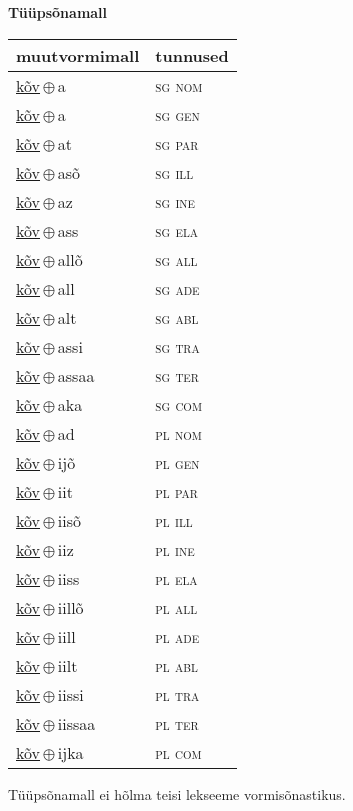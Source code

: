

\vspace{3.5em}
\noindent \begin{minipage}{\textwidth}
\noindent \textbf{Tüüpsõnamall \,}\\

\begin{sideways}
\begin{tabular}{l l}
muutvormimall & tunnused \\
\hline
\underline{kõv}\,$\oplus$\,a & \textsc{ sg nom } \\
\underline{kõv}\,$\oplus$\,a & \textsc{ sg gen } \\
\underline{kõv}\,$\oplus$\,at & \textsc{ sg par } \\
\underline{kõv}\,$\oplus$\,asõ & \textsc{ sg ill } \\
\underline{kõv}\,$\oplus$\,az & \textsc{ sg ine } \\
\underline{kõv}\,$\oplus$\,ass & \textsc{ sg ela } \\
\underline{kõv}\,$\oplus$\,allõ & \textsc{ sg all } \\
\underline{kõv}\,$\oplus$\,all & \textsc{ sg ade } \\
\underline{kõv}\,$\oplus$\,alt & \textsc{ sg abl } \\
\underline{kõv}\,$\oplus$\,assi & \textsc{ sg tra } \\
\underline{kõv}\,$\oplus$\,assaa & \textsc{ sg ter } \\
\underline{kõv}\,$\oplus$\,aka & \textsc{ sg com } \\
\underline{kõv}\,$\oplus$\,ad & \textsc{ pl nom } \\
\underline{kõv}\,$\oplus$\,ijõ & \textsc{ pl gen } \\
\underline{kõv}\,$\oplus$\,iit & \textsc{ pl par } \\
\underline{kõv}\,$\oplus$\,iisõ & \textsc{ pl ill } \\
\underline{kõv}\,$\oplus$\,iiz & \textsc{ pl ine } \\
\underline{kõv}\,$\oplus$\,iiss & \textsc{ pl ela } \\
\underline{kõv}\,$\oplus$\,iillõ & \textsc{ pl all } \\
\underline{kõv}\,$\oplus$\,iill & \textsc{ pl ade } \\
\underline{kõv}\,$\oplus$\,iilt & \textsc{ pl abl } \\
\underline{kõv}\,$\oplus$\,iissi & \textsc{ pl tra } \\
\underline{kõv}\,$\oplus$\,iissaa & \textsc{ pl ter } \\
\underline{kõv}\,$\oplus$\,ijka & \textsc{ pl com } \\
\end{tabular}
\end{sideways}
\label{tab:tüüpsõnamall-kõva}

\end{minipage}

 
\vspace{1em}
\noindent Tüüpsõnamall  ei hõlma teisi lekseeme vormi\-sõnastikus.
